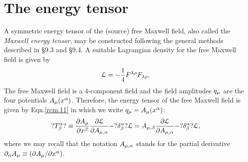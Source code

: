 \section{The energy tensor}
A symmetric  energy tensor of the (source) free Maxwell 
field, also called the \textsl{Maxwell energy tensor}, may 
be 
constructed following  the general methods described in 
\S9.3 and \S9.4. A suitable Lagrangian density for the 
free  Maxwell field is given by 
\begin{align}\label{rcm.88}
 \EuScript{L}=-\frac{1}{4}F^{{\lambda}{\rho}}F_{{\lambda}{\rho}},
\end{align}
The free Maxwell field is a 4-component field and the field 
amplitudes $q_{{\mu}}$ are the four potentials  
$A_{{\mu}}(x^{{\alpha}})$. Therefore, the energy tensor of  the free 
Maxwell field is given by Eqn.\eqref{rcm.11} in which we 
write $q_{{\mu}}=A_{{\mu}}(x^{{\alpha}})$:
\begin{align}\label{rcm.89}
 ?T^{{\alpha}}_{{\beta}}? \equiv \frac{{\partial} A_{{\mu}}}{{\partial} x^{{\beta}}}
\frac{{\partial} \EuScript{L}}{{\partial} A_{{\mu},{\alpha}}}
-?\delta^{{\alpha}}_{{\beta}}? \EuScript{L}=A_{{\mu},{\beta}}
\frac{{\partial} \EuScript{L}}{{\partial} A_{{\mu},{\alpha}}}
-?\delta^{{\alpha}}_{{\beta}}? \EuScript{L},
\end{align}
where we may recall that the notation $A_{{\mu},{\alpha}}$ 
stands 
for 
the partial derivative ${\partial}_{{\alpha}} A_{{\mu}}\equiv ({\partial} 
A_{{\mu}}/{\partial} x^{{\alpha}})$. 

